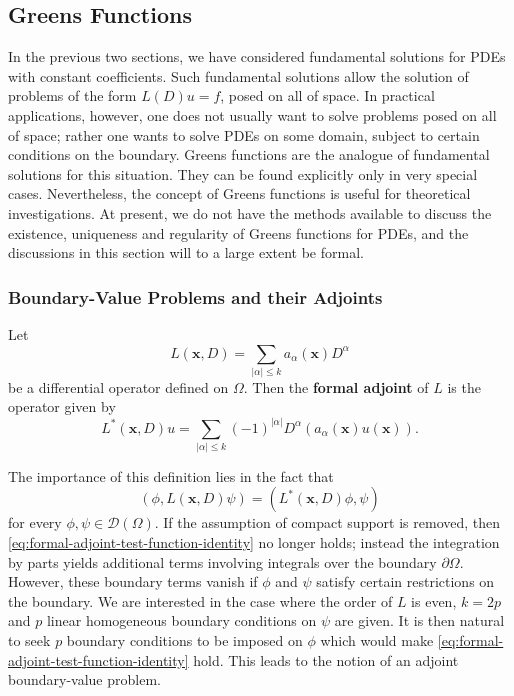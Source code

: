 \subsection{Green\textquotesingle s Functions}\label{sec:greens-functions}

In the previous two sections, we have considered fundamental solutions for PDEs with constant coefficients. Such fundamental solutions allow the solution of problems of the form $L(D)u=f$, posed on all of space. In practical applications, however, one does not usually want to solve problems posed on all of space; rather one wants to solve PDEs on some domain, subject to certain conditions on the boundary. Green\textquotesingle s functions are the analogue of fundamental solutions for this situation. They can be found explicitly only in very special cases. Nevertheless, the concept of Green\textquotesingle s functions is useful for theoretical investigations. At present, we do not have the methods available to discuss the existence, uniqueness and regularity of Green\textquotesingle s functions for PDEs, and the discussions in this section will to a large extent be formal.

\subsubsection{Boundary-Value Problems and their Adjoints}\label{subsec:boundary-value-problems-adjoints}

\begin{Definition}
\label{def:formal-adjoint-differential-operator}
Let
\begin{equation}\label{eq:variable-coefficient-differential-operator}
L(\bm{x},D)=\sum_{|\alpha|\leq k}a_\alpha(\bm{x})D^\alpha
\end{equation}
be a differential operator defined on $\Omega$. Then the \textbf{formal adjoint} of $L$ is the operator given by
\begin{equation}\label{eq:formal-adjoint-differential-operator}
L^*(\bm{x},D)u=\sum_{|\alpha|\leq k}(-1)^{|\alpha|}D^\alpha(a_\alpha(\bm{x})u(\bm{x})).
\end{equation}

\end{Definition}

The importance of this definition lies in the fact that
\begin{equation}\label{eq:formal-adjoint-test-function-identity}
(\phi,L(\bm{x},D)\psi)=(L^*(\bm{x},D)\phi,\psi)
\end{equation}
for every $\phi,\psi\in\mathcal{D}(\Omega)$. If the assumption of compact support is removed, then \eqref{eq:formal-adjoint-test-function-identity} no longer holds; instead the integration by parts yields additional terms involving integrals over the boundary $\partial\Omega$. However, these boundary terms vanish if $\phi$ and $\psi$ satisfy certain restrictions on the boundary. We are interested in the case where the order of $L$ is even, $k=2p$ and $p$ linear homogeneous boundary conditions on $\psi$ are given. It is then natural to seek $p$ boundary conditions to be imposed on $\phi$ which would make \eqref{eq:formal-adjoint-test-function-identity} hold. This leads to the notion of an adjoint boundary-value problem.


